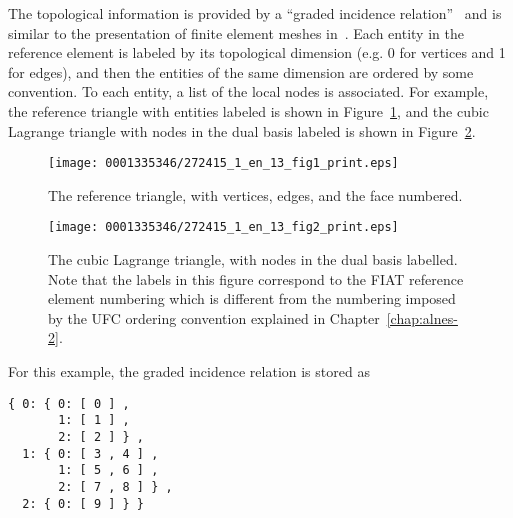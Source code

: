 The topological information is provided by a ``graded incidence
relation''~\citep{Kirby2006a,KnepleyKarpeev2009} and is similar to the
presentation of finite element meshes in~\citet{Logg2009}.  Each entity in
the reference element is labeled by its topological dimension (e.g. 0 for
vertices and 1 for edges), and then the entities of the same dimension
are ordered by some convention.  To each entity, a list of the local nodes
is associated.  For example, the reference triangle with entities labeled
is shown in Figure~\ref{fig:reftri}, and the cubic Lagrange triangle
with nodes in the dual basis labeled is shown in Figure~\ref{fig:p3}.

\makeatletter
\def\@img@cmode#1{\begingroup\color{graytwf}\mkrule{\ifnarrow 32mm\else\the\cmode@text@wd\fi}
{\ifnarrow 26pt\else\the\cmode@text@ht\fi}{\z@}\endgroup%
\llap{\vbox to\cmode@text@ht{\vss\hbox to\cmode@text@wd{\hss\ifnarrow\hspace*{65pt}\vbox to 31pt{\hsize7pc\raggedright#1}\else#1\fi\hss}\vss}}}
\makeatother


\begin{figure}[!b]
\vspace*{2pt}
\bwfig
\narrowfigure
\centering
\texttt{[image: 0001335346/272415\_1\_en\_13\_fig1\_print.eps]}
\caption{The reference triangle, with vertices, edges, and the
face numbered.}\label{fig:reftri}\vspace*{10pt}
\end{figure}

\begin{figure}[!b]
\bwfig
\narrowfigure
\centering
\texttt{[image: 0001335346/272415\_1\_en\_13\_fig2\_print.eps]}
\caption{The cubic Lagrange triangle, with nodes in the dual basis
labelled. Note that the labels in this figure correspond to the
FIAT reference element numbering which is different from the
numbering imposed by the UFC ordering convention explained in
Chapter~\ref{chap:alnes-2}.}
\label{fig:p3}\vspace*{6pt}
\end{figure}

For this example, the graded incidence relation is stored as
\begin{verbatim}
{ 0: { 0: [ 0 ] ,
       1: [ 1 ] ,
       2: [ 2 ] } ,
  1: { 0: [ 3 , 4 ] ,
       1: [ 5 , 6 ] ,
       2: [ 7 , 8 ] } ,
  2: { 0: [ 9 ] } }
\end{verbatim}

